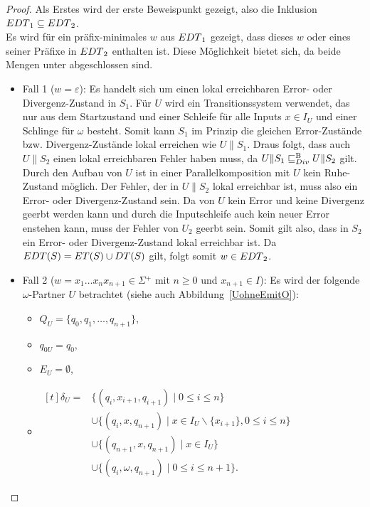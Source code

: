 \begin{proof}
  Als Erstes wird der erste Beweispunkt gezeigt, also die Inklusion
  $EDT{}_1\subseteq EDT{}_2$.\\
  Es wird für ein präfix-minimales $w$ aus $EDT{}_1$ gezeigt, dass dieses
  $w$ oder eines seiner Präfixe in $EDT{}_2$ enthalten ist. Diese Möglichkeit
  bietet sich, da beide Mengen unter \cont{} abgeschlossen sind.
  \begin{itemize}
    \item Fall 1 ($w=\varepsilon$): Es handelt sich um einen lokal erreichbaren
      Error- oder Divergenz-Zustand in $S_1$. Für $U$ wird ein Transitionssystem
      verwendet, das nur aus dem Startzustand und einer Schleife für alle
      Inputs $x\in I_U$ und einer Schlinge für $\omega$ besteht. Somit kann
      $S_1$ im Prinzip die gleichen Error-Zustände bzw. Divergenz-Zustände
      lokal erreichen wie $U\|S_1$. Draus folgt, dass auch $U\|S_2$ einen lokal
      erreichbaren Fehler haben muss, da $U\|S_1\sqsubseteq _{Div}^\mathrm{B} U\|S_2$ gilt. Durch den
      Aufbau von $U$ ist in einer Parallelkomposition mit $U$ kein
      Ruhe-Zustand möglich. Der Fehler, der in $U\|S_2$ lokal erreichbar ist,
      muss also ein Error- oder Divergenz-Zustand sein. Da von $U$ kein Error
      und keine Divergenz geerbt werden kann und durch die Inputschleife auch
      kein neuer Error enstehen kann, muss der Fehler von $U_2$ geerbt sein.
      Somit gilt also, dass in $S_2$ ein Error- oder Divergenz-Zustand lokal
      erreichbar ist. Da $EDT{}(S) = ET{}(S)\cup DT{}(S)$ gilt, folgt somit
      $w\in EDT{}_2$.
    \item Fall 2 ($w=x_1\dots x_nx_{n+1}\in\Sigma{} ^+$ mit $n\geq 0$ und
      $x_{n+1}\in I$): Es wird der folgende $\omega$-Partner $U$ betrachtet
      (siehe auch Abbildung~\ref{UohneEmitO}):
      \begin{itemize}
        \item $Q_U=\{q_0,q_1,\dots ,q_{n+1}\}$,
        \item $q_{0U}=q_0$,
        \item $E_U=\emptyset$,
        \item $\begin{aligned}[t]
            \delta _U=&\{(q_i,x_{i+1},q_{i+1})\mid  0\leq i\leq n\}\\
                      &\cup\{(q_i,x,q_{n+1})\mid  x\in I_U\backslash\{x_{i+1}\},
          0\leq i\leq n\}\\
          &\cup\{(q_{n+1},x,q_{n+1})\mid  x\in I_U\}\\
          &\cup\{(q_i,\omega ,q_{n+1})\mid 0\leq i\leq n+1\}.
        \end{aligned}$
      \end{itemize}
      \begin{figure} [h!tbp]
      \begin{center}
\end{center}
\end{figure}
\end{itemize}
\end{proof}
